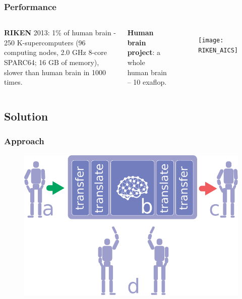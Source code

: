\documentclass[12pt, aspectratio=169]{beamer}
\begin{document}
\begin{frame}
\frametitle{Performance}
\begin{columns}[c] %

\textbf{RIKEN} 2013: 1\% of human brain - 250 K-supercomputers
(96 computing nodes, 2.0 GHz 8-core SPARC64; 16 GB of memory), slower than human brain in 1000 times. 

\textbf{Human brain project}: a whole human brain -- 10 exaflop.


\begin{figure}
\texttt{[image: RIKEN\_AICS]}
\end{figure}
\end{columns}
\end{frame}


\subsection{Solution}

\begin{frame}
\frametitle{Approach}
\begin{figure}
\includegraphics[width=0.8\linewidth]{robot-dream}
\end{figure}
\end{frame}

\end{document}
